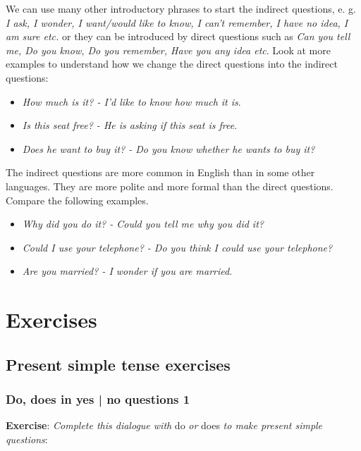 We can use many other introductory phrases to start the indirect questions, e. g. \textit{I ask, I wonder, I want/would like to know, I can't remember, I have no idea, I am sure etc.} or they can be introduced by direct questions such as \textit{Can you tell me, Do you know, Do you remember, Have you any idea etc}. Look at more examples to understand how we change the direct questions into the indirect questions:

\begin{itemize} 

\item \textit{How much is it? - I'd like to know how much it is}.
\item \textit{Is this seat free? - He is asking if this seat is free}.
\item \textit{Does he want to buy it? - Do you know whether he wants to buy it?}
\end{itemize}

The indirect questions are more common in English than in some other languages. They are more polite and more formal than the direct questions. Compare the following examples.

\begin{itemize}

\item \textit{Why did you do it? - Could you tell me why you did it?}
\item \textit{Could I use your telephone? - Do you think I could use your telephone?}
\item \textit{Are you married? - I wonder if you are married}.

\end{itemize}



\section{Exercises}

\subsection{Present simple tense exercises}

\subsubsection{Do, does in yes | no questions 1}

\textbf{Exercise}: \textit{Complete this dialogue with} do \textit{or} does \textit{to make present simple  questions}:

